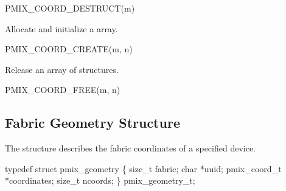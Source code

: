 \cspecificstart
\begin{codepar}
PMIX_COORD_DESTRUCT(m)
\end{codepar}
\cspecificend

\begin{arglist}
\end{arglist}


Allocate and initialize a  array.

\cspecificstart
\begin{codepar}
PMIX_COORD_CREATE(m, n)
\end{codepar}
\cspecificend

\begin{arglist}
\end{arglist}


Release an array of  structures.

\cspecificstart
\begin{codepar}
PMIX_COORD_FREE(m, n)
\end{codepar}
\cspecificend

\begin{arglist}
\end{arglist}


\subsection{Fabric Geometry Structure}

The  structure describes the fabric coordinates of a specified device.

\cspecificstart
\begin{codepar}
typedef struct pmix_geometry \{
    size_t fabric;
    char *uuid;
    pmix_coord_t *coordinates;
    size_t ncoords;
\} pmix_geometry_t;
\end{codepar}
\cspecificend

